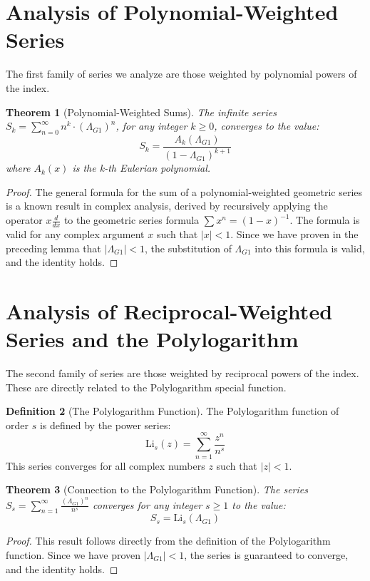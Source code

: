 \documentclass{amsart}
\theoremstyle{plain}
\newtheorem{theorem}{Theorem}[section]
\theoremstyle{definition}
\newtheorem{definition}[theorem]{Definition}
\theoremstyle{remark}
\newcommand{\LambdaG}{\Lambda_{G1}}
\begin{document}
\section{Analysis of Polynomial-Weighted Series}
The first family of series we analyze are those weighted by polynomial powers of the index.

\begin{theorem}[Polynomial-Weighted Sums]
The infinite series $S_k = \sum_{n=0}^{\infty} n^k \cdot (\LambdaG)^n$, for any integer $k \ge 0$, converges to the value:
$$S_k = \frac{A_k(\LambdaG)}{(1-\LambdaG)^{k+1}}$$
where $A_k(x)$ is the k-th Eulerian polynomial.
\end{theorem}
\begin{proof}
The general formula for the sum of a polynomial-weighted geometric series is a known result in complex analysis, derived by recursively applying the operator $x \frac{d}{dx}$ to the geometric series formula $\sum x^n = (1-x)^{-1}$. The formula is valid for any complex argument $x$ such that $|x|<1$. Since we have proven in the preceding lemma that $|\LambdaG|<1$, the substitution of $\LambdaG$ into this formula is valid, and the identity holds.
\end{proof}

\section{Analysis of Reciprocal-Weighted Series and the Polylogarithm}
The second family of series are those weighted by reciprocal powers of the index. These are directly related to the Polylogarithm special function.

\begin{definition}[The Polylogarithm Function]
The Polylogarithm function of order $s$ is defined by the power series:
$$ \mathrm{Li}_s(z) = \sum_{n=1}^{\infty} \frac{z^n}{n^s} $$
This series converges for all complex numbers $z$ such that $|z|<1$.
\end{definition}

\begin{theorem}[Connection to the Polylogarithm Function]
The series $S_s = \sum_{n=1}^{\infty} \frac{(\LambdaG)^{n}}{n^s}$ converges for any integer $s \ge 1$ to the value:
$$S_s = \mathrm{Li}_s(\LambdaG)$$
\end{theorem}
\begin{proof}
This result follows directly from the definition of the Polylogarithm function. Since we have proven $|\LambdaG| < 1$, the series is guaranteed to converge, and the identity holds.
\end{proof}
\end{document}
